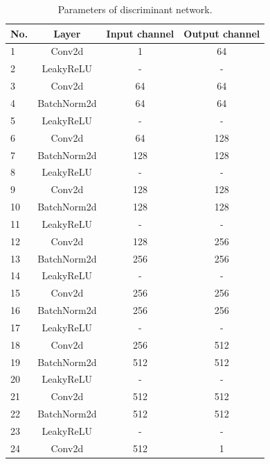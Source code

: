 \documentclass[10pt,twocolumn,letterpaper]{article}
\begin{document}
\begin{table}
\begin{center}
	\begin{tabular}{lccc}
		\hline		
		No.&Layer      &Input channel&Output channel\\
		\hline
		1  &Conv2d     &1        &64    \\
		2  &LeakyReLU  &-        &-       \\
		3  &Conv2d     &64       &64     	\\
		4  &BatchNorm2d&64       &64    \\
		5  &LeakyReLU  &-        &-        \\
		6  &Conv2d     &64       &128       \\
		7  &BatchNorm2d&128      &128      \\
		8  &LeakyReLU  &-        &-        \\
		9  &Conv2d     &128      &128     \\
		10 &BatchNorm2d&128      &128      \\
		11 &LeakyReLU  &-        &-      \\
		12 &Conv2d     &128      &256     \\
		13 &BatchNorm2d&256      &256 \\
		14 &LeakyReLU  &-        &-      \\
		15 &Conv2d     &256      &256     \\
		16 &BatchNorm2d&256      &256     \\
		17 &LeakyReLU  &-        &-       \\
		18 &Conv2d     &256      &512     \\
		19 &BatchNorm2d&512      &512     \\
		20 &LeakyReLU  &-        &-       \\
		21 &Conv2d     &512      &512     \\
		22 &BatchNorm2d&512      &512     \\
		23 &LeakyReLU  &-        &-       \\
		24 &Conv2d     &512      &1       \\
		\hline
	\end{tabular}
\end{center}
\caption{Parameters of discriminant network.}
\label{tab1}
\end{table}
\end{document}
